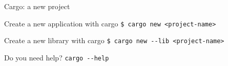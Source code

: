     \begin{frame}{Cargo: a new project}
        \begin{block}{Create a new application with cargo}
            \tt{\$ cargo new <project-name>}
        \end{block}

        \begin{block}{Create a new library with cargo}
            \tt{\$ cargo new -{}-lib <project-name>}
        \end{block}

        \begin{alertblock}{Do you need help?}
            \tt{cargo -{}-help}
        \end{alertblock}
    \end{frame}